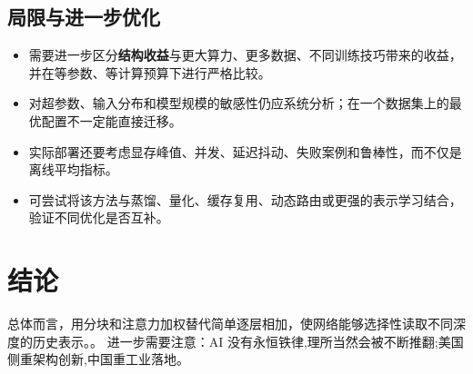\documentclass[UTF8,11pt,a4paper]{ctexart}
\newcommand{\term}[1]{\textbf{\textcolor{mainblue}{#1}}}
\begin{document}
\subsection{局限与进一步优化}
\begin{itemize}
\item 需要进一步区分\term{结构收益}与更大算力、更多数据、不同训练技巧带来的收益，并在等参数、等计算预算下进行严格比较。
\item 对超参数、输入分布和模型规模的敏感性仍应系统分析；在一个数据集上的最优配置不一定能直接迁移。
\item 实际部署还要考虑显存峰值、并发、延迟抖动、失败案例和鲁棒性，而不仅是离线平均指标。
\item 可尝试将该方法与蒸馏、量化、缓存复用、动态路由或更强的表示学习结合，验证不同优化是否互补。
\end{itemize}

\section{结论}
总体而言，用分块和注意力加权替代简单逐层相加，使网络能够选择性读取不同深度的历史表示。。 进一步需要注意：AI 没有永恒铁律,理所当然会被不断推翻;美国侧重架构创新,中国重工业落地。
\end{document}
